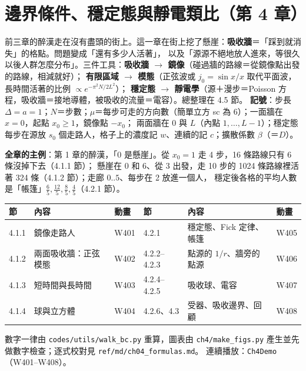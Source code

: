 

\section{邊界條件、穩定態與靜電類比（第 4 章）}

\begin{keybox}[先看這裡]
前三章的醉漢走在沒有盡頭的街上。這一章在街上挖了懸崖：\textbf{吸收牆}＝「踩到就消失」的格點。問題變成「還有多少人活著」，
以及「源源不絕地放人進來，等很久以後人群怎麼分布」。三件工具：\textbf{吸收牆 $\to$ 鏡像}（碰過牆的路線＝從鏡像點出發的路線，相減就好）；
\textbf{有限區域 $\to$ 模態}（正弦波或 $j_0=\sin x/x$ 取代平面波，長時間活著的比例 $\propto e^{-\pi^2N/2L^2}$）；
\textbf{穩定態 $\to$ 靜電學}（源＋漫步＝Poisson 方程，吸收牆＝接地導體，被吸收的流量＝電容）。總整理在 4.5 節。
\textbf{記號}：步長 $\Delta=a=1$；$N$＝步數；$\mu$＝每步可走的方向數（簡單立方 sc 為 6）；一面牆在 $x=0$，起點 $x_0\ge1$，鏡像點 $-x_0$；
兩面牆在 $0$ 與 $L$（內點 $1,\dots,L-1$）；穩定態每步在源放 $s_0$ 個走路人，格子上的濃度記 $w$、連續的記 $c$；擴散係數 $\beta$（＝$D$）。

\textbf{全章的主例}：第 1 章的醉漢，「0 是懸崖」。從 $x_0=1$ 走 4 步，16 條路線只有 6 條沒掉下去（4.1.1 節）；
懸崖在 0 和 6、從 3 出發，走 10 步的 1024 條路線裡活著 324 條（4.1.2 節）；走廊 $0..5$、每步在 2 放進一個人，
穩定後各格的平均人數是「帳篷」$\frac65,\frac{12}5,\frac85,\frac45$（4.2.1 節）。
\begin{center}
\small
\begin{tabular}{@{}lll@{\qquad}lll@{}}
\toprule
節 & 內容 & 動畫 & 節 & 內容 & 動畫\\
\midrule
4.1.1 & 鏡像走路人 & W401 & 4.2.1 & 穩定態、Fick 定律、帳篷 & W405\\
4.1.2 & 兩面吸收牆：正弦模態 & W402 & 4.2.2--4.2.3 & 點源的 $1/r$、牆旁的點源 & W406\\
4.1.3 & 短時間與長時間 & W403 & 4.2.4--4.2.5 & 吸收球、電容 & W407\\
4.1.4 & 球與立方體 & W404 & 4.2.6、4.3 & 受器、吸收邊界、回顧 & W408\\
\bottomrule
\end{tabular}
\end{center}
數字一律由 \texttt{codes/utils/walk\_bc.py} 重算，圖表由 \texttt{ch4/make\_figs.py} 產生並先做數字檢查；逐式校對見 \texttt{ref/md/ch04\_formulas.md}。
連續播放：\texttt{Ch4Demo}（W401--W408）。
\end{keybox}

